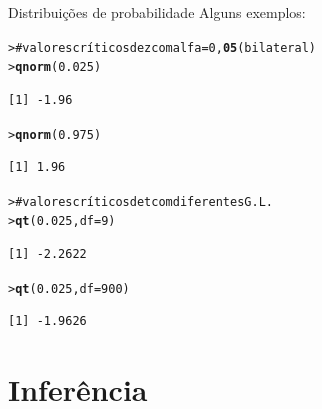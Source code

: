 \documentclass[10pt]{beamer}\usepackage{graphicx, color}
\makeatletter
\newcommand{\hlfunctioncall}[1]{\textcolor[rgb]{0,0,0.545098039215686}{\textbf{#1}}}%
\newcommand{\hlcomment}[1]{\textcolor[rgb]{0.2,0.2,0.2}{#1}}%
\newenvironment{kframe}{%
 \def\at@end@of@kframe{}%
 \ifinner\ifhmode%
  \def\at@end@of@kframe{\end{minipage}}%
  \begin{minipage}{\columnwidth}%
 \fi\fi%
 \def\FrameCommand##1{\hskip\@totalleftmargin \hskip-\fboxsep
 \colorbox{shadecolor}{##1}\hskip-\fboxsep
     \hskip-\linewidth \hskip-\@totalleftmargin \hskip\columnwidth}%
 \MakeFramed {\advance\hsize-\width
   \@totalleftmargin\z@ \linewidth\hsize
   \@setminipage}}%
 {\par\unskip\endMakeFramed%
 \at@end@of@kframe}
\newenvironment{knitrout}{}{} %
\makeatother
\begin{document}
\begin{frame}[fragile=singleslide]{Distribuições de probabilidade}
Alguns exemplos:
\begin{knitrout}\small
{}\color{fgcolor}\begin{kframe}
\begin{alltt}
> \hlcomment{# valores críticos de z com alfa = 0,\hlfunctioncall{05} (bilateral)}
> \hlfunctioncall{qnorm}(0.025)
\end{alltt}
\begin{verbatim}
[1] -1.96
\end{verbatim}
\begin{alltt}
> \hlfunctioncall{qnorm}(0.975)
\end{alltt}
\begin{verbatim}
[1] 1.96
\end{verbatim}
\begin{alltt}
> \hlcomment{# valores críticos de t com diferentes G.L.}
> \hlfunctioncall{qt}(0.025, df = 9)
\end{alltt}
\begin{verbatim}
[1] -2.2622
\end{verbatim}
\begin{alltt}
> \hlfunctioncall{qt}(0.025,df = 900)
\end{alltt}
\begin{verbatim}
[1] -1.9626
\end{verbatim}
\end{kframe}
\end{knitrout}

\end{frame}


\section{Inferência}
\end{document}
